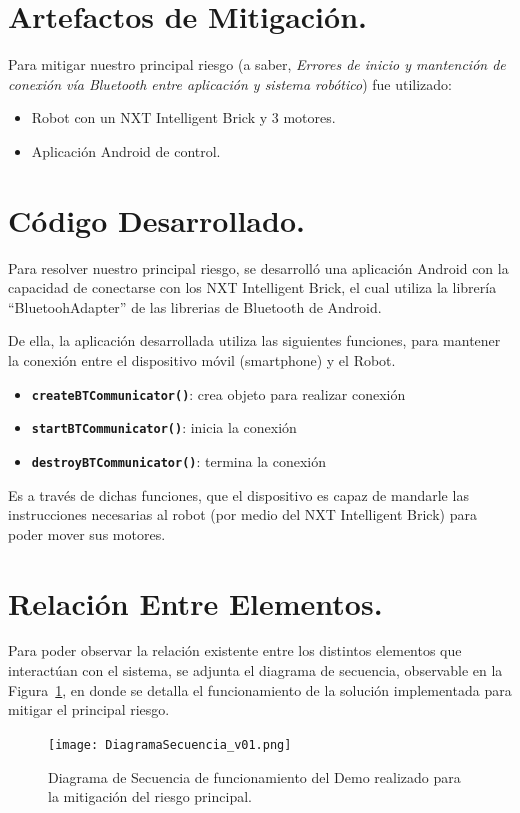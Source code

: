 \documentclass[letterpaper,12pt]{article} %
\numberwithin{equation}{section} %
\numberwithin{figure}{section} %
\numberwithin{table}{section} %
\begin{document}

\setcounter{page}{1} %


\section{Artefactos de Mitigaci\'on.}
Para mitigar nuestro principal riesgo (a saber, \emph{Errores de inicio y mantenci\'on de conexi\'on v\'ia Bluetooth entre aplicaci\'on y sistema rob\'otico}) fue utilizado:

\begin{itemize}
\item Robot con un NXT Intelligent Brick y 3 motores.
\item Aplicaci\'on Android de control.
\end{itemize}

\section{C\'odigo Desarrollado.}
Para resolver nuestro principal riesgo, se desarroll\'o una aplicaci\'on Android con la capacidad de conectarse con los NXT Intelligent Brick, el cual utiliza la librer\'ia ``BluetoohAdapter'' de las librerias de Bluetooth de Android.

De ella, la aplicaci\'on desarrollada utiliza las siguientes funciones, para mantener la conexi\'on entre el dispositivo m\'ovil (smartphone) y el Robot.

\begin{itemize}
\item {\bf \verb+createBTCommunicator()+}: crea objeto para realizar conexi\'on
\item {\bf \verb+startBTCommunicator()+}: inicia la conexi\'on
\item {\bf \verb+destroyBTCommunicator()+}: termina la conexi\'on
\end{itemize}

Es a trav\'es de dichas funciones, que el dispositivo es capaz de mandarle las instrucciones necesarias al robot (por medio del NXT Intelligent Brick) para poder mover sus motores.

\section{Relaci\'on Entre Elementos.} %
Para poder observar la relaci\'on existente entre los distintos elementos que interact\'uan con el sistema, se adjunta el diagrama de secuencia, observable en la Figura~\ref{img:diagrama}, en donde se detalla el funcionamiento de la soluci\'on implementada para mitigar el principal riesgo.

\begin{figure}[H]
   \centering
     \texttt{[image: DiagramaSecuencia\_v01.png]}
   \caption{Diagrama de Secuencia de funcionamiento del Demo realizado para la mitigaci\'on del riesgo principal.}
   \label{img:diagrama}
\end{figure}
\end{document}
